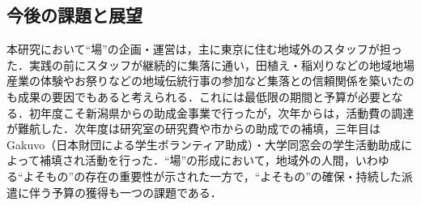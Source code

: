 \documentclass[a4paper]{jsarticle}
\begin{document}
\subsection{今後の課題と展望}
本研究において“場”の企画・運営は，主に東京に住む地域外のスタッフが担った．実践の前にスタッフが継続的に集落に通い，田植え・稲刈りなどの地域地場産業の体験やお祭りなどの地域伝統行事の参加など集落との信頼関係を築いたのも成果の要因でもあると考えられる．これには最低限の期間と予算が必要となる．初年度こそ新潟県からの助成金事業で行ったが，次年からは，活動費の調達が難航した．次年度は研究室の研究費や市からの助成での補填，三年目はGakuvo（日本財団による学生ボランティア助成）・大学同窓会の学生活動助成によって補填され活動を行った．“場”の形成において，地域外の人間，いわゆる“よそもの”の存在の重要性が示された一方で，“よそもの”の確保・持続した派遣に伴う予算の獲得も一つの課題である．\par


\newpage
\end{document}
